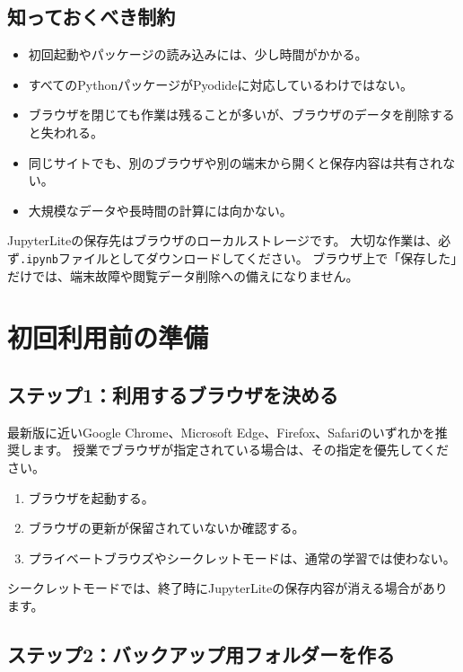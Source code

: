 \documentclass[a4paper,11pt]{ltjsarticle}
\begin{document}
\subsection{知っておくべき制約}

\begin{itemize}
  \item 初回起動やパッケージの読み込みには、少し時間がかかる。
  \item すべてのPythonパッケージがPyodideに対応しているわけではない。
  \item ブラウザを閉じても作業は残ることが多いが、ブラウザのデータを削除すると失われる。
  \item 同じサイトでも、別のブラウザや別の端末から開くと保存内容は共有されない。
  \item 大規模なデータや長時間の計算には向かない。
\end{itemize}

\begin{warningbox}[保存場所について]
JupyterLiteの保存先はブラウザのローカルストレージです。
大切な作業は、必ず\texttt{.ipynb}ファイルとしてダウンロードしてください。
ブラウザ上で「保存した」だけでは、端末故障や閲覧データ削除への備えになりません。
\end{warningbox}

\section{初回利用前の準備}

\subsection{ステップ1：利用するブラウザを決める}

最新版に近いGoogle Chrome、Microsoft Edge、Firefox、Safariのいずれかを推奨します。
授業でブラウザが指定されている場合は、その指定を優先してください。

\begin{enumerate}
  \item ブラウザを起動する。
  \item ブラウザの更新が保留されていないか確認する。
  \item プライベートブラウズやシークレットモードは、通常の学習では使わない。
\end{enumerate}

シークレットモードでは、終了時にJupyterLiteの保存内容が消える場合があります。

\subsection{ステップ2：バックアップ用フォルダーを作る}
\end{document}
